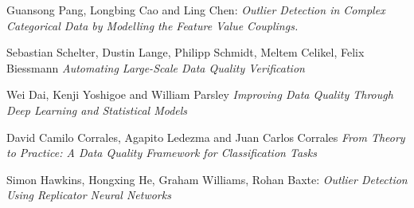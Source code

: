 \documentclass{article}
\begin{document}
\begin{thebibliography}{999}

    Guansong Pang, Longbing Cao and Ling Chen:
    \emph{Outlier Detection in Complex Categorical Data
        by Modelling the Feature Value Couplings.}

    Sebastian Schelter, Dustin Lange, Philipp Schmidt, Meltem Celikel, Felix Biessmann
    \emph{Automating Large-Scale Data Quality Verification}

    Wei Dai, Kenji Yoshigoe and William Parsley
    \emph{Improving Data Quality Through Deep Learning and Statistical Models}

    David Camilo Corrales, Agapito Ledezma and Juan Carlos Corrales
    \emph{From Theory to Practice: A Data Quality Framework
        for Classification Tasks}

    Simon Hawkins, Hongxing He, Graham Williams, Rohan Baxte:
    \emph{Outlier Detection Using Replicator Neural Networks}

\end{thebibliography}
\end{document}
